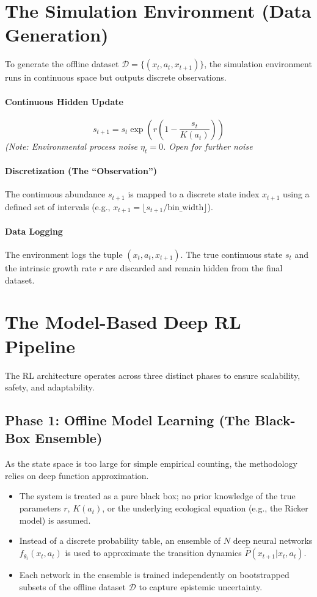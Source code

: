 \documentclass[11pt]{article}
\begin{document}
\section{The Simulation Environment (Data Generation)}
To generate the offline dataset $\mathcal{D} = \{(x_t, a_t, x_{t+1})\}$, the simulation environment runs in continuous space but outputs discrete observations.

\paragraph{Continuous Hidden Update}
$$s_{t+1} = s_t \exp\left(r \left(1 - \frac{s_t}{K(a_t)}\right)\right)$$
\textit{(Note: Environmental process noise $\eta_t = 0$. Open for further noise}

\paragraph{Discretization (The ``Observation'')}
The continuous abundance $s_{t+1}$ is mapped to a discrete state index $x_{t+1}$ using a defined set of intervals (e.g., $x_{t+1} = \lfloor s_{t+1} / \text{bin\_width} \rfloor$).

\paragraph{Data Logging}
The environment logs the tuple $(x_t, a_t, x_{t+1})$. The true continuous state $s_t$ and the intrinsic growth rate $r$ are discarded and remain hidden from the final dataset.

\section{The Model-Based Deep RL Pipeline}
The RL architecture operates across three distinct phases to ensure scalability, safety, and adaptability.

\subsection{Phase 1: Offline Model Learning (The Black-Box Ensemble)}
As the state space is too large for simple empirical counting, the methodology relies on deep function approximation.
\begin{itemize}
    \item The system is treated as a pure black box; no prior knowledge of the true parameters $r$, $K(a_t)$, or the underlying ecological equation (e.g., the Ricker model) is assumed.
    \item Instead of a discrete probability table, an ensemble of $N$ deep neural networks $f_{\theta_i}(x_t, a_t)$ is used to approximate the transition dynamics $\hat{P}(x_{t+1} | x_t, a_t)$.
    \item Each network in the ensemble is trained independently on bootstrapped subsets of the offline dataset $\mathcal{D}$ to capture epistemic uncertainty.
\end{itemize}
\end{document}
